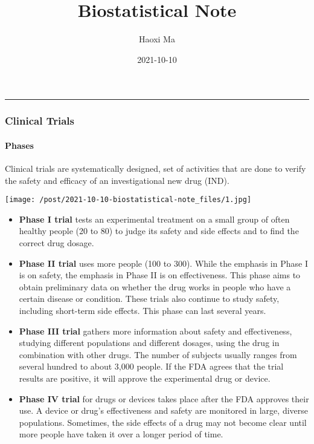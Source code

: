 \documentclass[
]{ctexart}
\title{Biostatistical Note}
\author{Haoxi Ma}
\date{2021-10-10}
\begin{document}
\maketitle

\begin{center}\rule{0.5\linewidth}{0.5pt}\end{center}

\hypertarget{clinical-trials}{%
\subsubsection{\texorpdfstring{\textbf{Clinical
Trials}}{Clinical Trials}}\label{clinical-trials}}

\hypertarget{phases}{%
\paragraph{Phases}\label{phases}}

Clinical trials are systematically designed, set of activities that are
done to verify the safety and efficacy of an investigational new drug
(IND).

\texttt{[image: /post/2021-10-10-biostatistical-note\_files/1.jpg]}

\begin{itemize}
\item
  \textbf{Phase I trial} tests an experimental treatment on a small
  group of often healthy people (20 to 80) to judge its safety and side
  effects and to find the correct drug dosage.
\item
  \textbf{Phase II trial} uses more people (100 to 300). While the
  emphasis in Phase I is on safety, the emphasis in Phase II is on
  effectiveness. This phase aims to obtain preliminary data on whether
  the drug works in people who have a certain disease or condition.
  These trials also continue to study safety, including short-term side
  effects. This phase can last several years.
\item
  \textbf{Phase III trial} gathers more information about safety and
  effectiveness, studying different populations and different dosages,
  using the drug in combination with other drugs. The number of subjects
  usually ranges from several hundred to about 3,000 people. If the FDA
  agrees that the trial results are positive, it will approve the
  experimental drug or device.
\item
  \textbf{Phase IV trial} for drugs or devices takes place after the FDA
  approves their use. A device or drug's effectiveness and safety are
  monitored in large, diverse populations. Sometimes, the side effects
  of a drug may not become clear until more people have taken it over a
  longer period of time.
\end{itemize}
\end{document}
